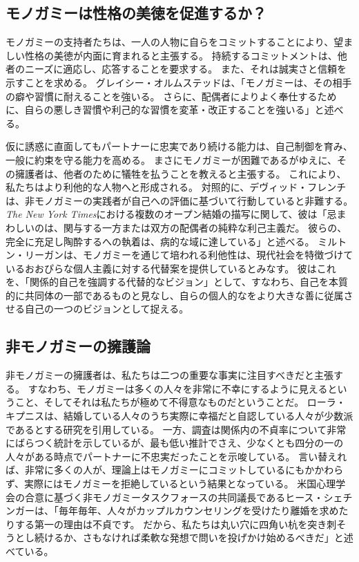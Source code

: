 \documentclass[paper=a4,book,openany]{jlreq}
\begin{document}
\subsection{モノガミーは性格の美徳を促進するか？}

モノガミーの支持者たちは、一人の人物に自らをコミットすることにより、望ましい性格の美徳が内面に育まれると主張する。
持続するコミットメントは、他者のニーズに適応し、応答することを要求する。
また、それは誠実さと信頼を示すことを求める。
グレイシー・オルムステッドは、「モノガミーは、その相手の癖や習慣に耐えることを強いる。
さらに、配偶者によりよく奉仕するために、自らの悪しき習慣や利己的な習慣を変革・改正することを強いる」と述べる\citep{olmstead14:_in_defen_monog_marriag}。

仮に誘惑に直面してもパートナーに忠実であり続ける能力は、自己制御を育み、一般に約束を守る能力を高める。
まさにモノガミーが困難であるがゆえに、その擁護者は、他者のために犠牲を払うことを教えると主張する。
これにより、私たちはより利他的な人物へと形成される。
対照的に、デヴィッド・フレンチは、非モノガミーの実践者が自己への評価に基づいて行動していると非難する。
\emph{The New York Times}における複数のオープン結婚の描写に関して、彼は「忌まわしいのは、関与する一方または双方の配偶者の純粋な利己主義だ。
彼らの、完全に充足し陶酔するへの執着は、病的な域に達している」と述べる\citep{french17:_this_is_how_elite_poison_our_cultur}。
ミルトン・リーガンは、モノガミーを通じて培われる利他性は、現代社会を特徴づけているおおぴらな個人主義に対する代替案を提供しているとみなす。
彼はこれを、「関係的自己を強調する代替的なビジョン」として、すなわち、自己を本質的に共同体の一部であるものと見なし、自らの個人的なをより大きな善に従属させる自己の一つのビジョンとして捉える\citep[p.159]{regan96:_postm_famil_law}。

\subsection{非モノガミーの擁護論}

非モノガミーの擁護者は、私たちは二つの重要な事実に注目すべきだと主張する。
すなわち、モノガミーは多くの人々を非常に不幸にするように見えるということ、そしてそれは私たちが極めて不得意なものだということだ。
ローラ・キプニスは、結婚している人々のうち実際に幸福だと自認している人々が少数派であるとする研究を引用している\citep{kipnis03:_again_love}。
一方、調査は関係内の不貞率について非常にばらつく統計を示しているが、最も低い推計でさえ、少なくとも四分の一の人々がある時点でパートナーに不忠実だったことを示唆している\citep{blow05:_infid_commit_relat_ii,whisman07:_sexual_infid_nation_survey_americ_women}。
言い替えれば、非常に多くの人が、理論上はモノガミーにコミットしているにもかかわらず、実際にはモノガミーを拒絶しているという結果となっている。
米国心理学会の合意に基づく非モノガミータスクフォースの共同議長であるヒース・シェチンガーは、「毎年毎年、人々がカップルカウンセリングを受けたり離婚を求めたりする第一の理由は不貞です。
だから、私たちは丸い穴に四角い杭を突き刺そうとし続けるか、さもなければ柔軟な発想で問いを投げかけ始めるべきだ」と述べている\citep{hunt20:_psych_threes}。
\end{document}
